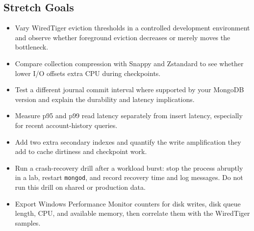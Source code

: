 \subsection*{Stretch Goals}
\begin{itemize}
    \item Vary WiredTiger eviction thresholds in a controlled development environment and observe whether foreground eviction decreases or merely moves the bottleneck.
    \item Compare collection compression with Snappy and Zstandard to see whether lower I/O offsets extra CPU during checkpoints.
    \item Test a different journal commit interval where supported by your MongoDB version and explain the durability and latency implications.
    \item Measure p95 and p99 read latency separately from insert latency, especially for recent account-history queries.
    \item Add two extra secondary indexes and quantify the write amplification they add to cache dirtiness and checkpoint work.
    \item Run a crash-recovery drill after a workload burst: stop the process abruptly in a lab, restart \texttt{mongod}, and record recovery time and log messages. Do not run this drill on shared or production data.
    \item Export Windows Performance Monitor counters for disk writes, disk queue length, CPU, and available memory, then correlate them with the WiredTiger samples.
\end{itemize}
